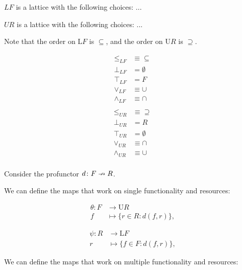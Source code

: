 \begin{lemma}
$LF$ is a lattice with the following choices: ...
\end{lemma}
\begin{lemma}
$UR$ is a lattice with the following choices: ...

Note that the order on $\mathrm{L}F$ is $\subseteq$, and the order on $\mathrm{U}R$ is $\supseteq$.
\end{lemma}


\begin{align}
    \leq_{LF} & \equiv \subseteq \\ 
    \bot_{LF} & = \emptyset \\
    \top_{LF} & = F \\
    \vee_{LF} & \equiv \cup \\
    \wedge_{LF} & \equiv \cap \\
\end{align}
\begin{align}
    \leq_{UR} & \equiv \supseteq \\ 
    \bot_{UR} & =  R\\
    \top_{UR} & = \emptyset \\
    \vee_{UR} &\equiv \cap\\
    \wedge_{UR} & \equiv \cup \\
\end{align}

Consider the profunctor $d\colon F\nrightarrow R$. 

We can define the maps that work on single functionality 
and resources:

\begin{equation}
    \begin{aligned}
    \theta\colon F&\to \mathrm{U}R\\
    f&\mapsto \{r\in R : d(f, r) \},
    \end{aligned}
\end{equation}

\begin{equation}
    \begin{aligned}
    \psi\colon R&\to \mathrm{L}F\\
    r&\mapsto \{f\in F : d(f, r) \},
    \end{aligned}
\end{equation}

We can define the maps that work on multiple functionality 
and resources:

